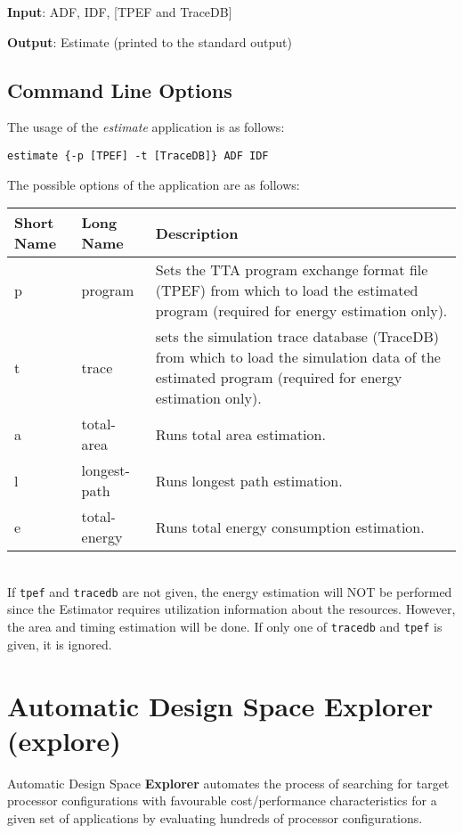 \documentclass[twoside]{tceusermanual}
\begin{document}
\textbf{Input}: ADF, IDF, [TPEF and TraceDB]

\textbf{Output}: Estimate (printed to the standard output)

\subsection{Command Line Options}

The usage of the \emph{estimate} application is as follows:

\begin{verbatim}
estimate {-p [TPEF] -t [TraceDB]} ADF IDF
\end{verbatim}

The possible options of the application are as follows:\\

\begin{tabular}{p{}p{}
                p{}}
\textbf{Short Name} &\textbf{Long Name} &\textbf{Description} \\
\hline
p & program & Sets the TTA program exchange format file (TPEF) from which to
load the estimated program (required for energy estimation only). \\
t & trace & sets the simulation trace database (TraceDB) from which to load
the simulation data of the estimated program (required for energy estimation
only). \\
a & total-area & Runs total area estimation.\\
l & longest-path & Runs longest path estimation.\\
e & total-energy & Runs total energy consumption estimation.\\
\end{tabular}\\

If \verb|tpef| and \verb|tracedb| are not given, the energy estimation
will NOT be performed since the Estimator requires utilization
information about the resources. However, the area and timing
estimation will be done. If only one of \verb|tracedb| and \verb|tpef|
is given, it is ignored.

\section{Automatic Design Space Explorer (explore)}
\label{section:explore}

Automatic Design Space \textbf{Explorer} automates the
process of searching for target processor configurations with favourable
cost/performance characteristics for a given set of applications by
evaluating hundreds of processor configurations.
\end{document}
